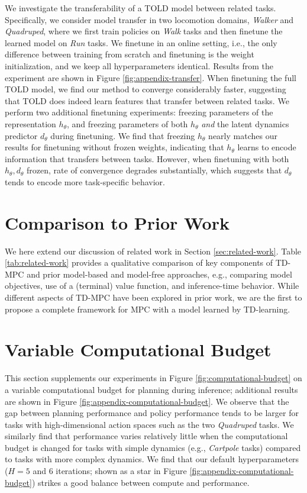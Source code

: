 \documentclass{article}
\begin{document}
We investigate the transferability of a TOLD model between related tasks. Specifically, we consider model transfer in two locomotion domains, \textit{Walker} and \textit{Quadruped}, where we first train policies on \textit{Walk} tasks and then finetune the learned model on \textit{Run} tasks. We finetune in an online setting, i.e., the only difference between training from scratch and finetuning is the weight initialization, and we keep all hyperparameters identical. Results from the experiment are shown in Figure \ref{fig:appendix-transfer}. When finetuning the full TOLD model, we find our method to converge considerably faster, suggesting that TOLD does indeed learn features that transfer between related tasks. We perform two additional finetuning experiments: freezing parameters of the representation $h_{\theta}$, and freezing parameters of both $h_{\theta}$ \textit{and} the latent dynamics predictor $d_{\theta}$ during finetuning. We find that freezing $h_{\theta}$ nearly matches our results for finetuning without frozen weights, indicating that $h_{\theta}$ learns to encode information that transfers between tasks. However, when finetuning with both $h_{\theta},d_{\theta}$ frozen, rate of convergence degrades substantially, which suggests that $d_{\theta}$ tends to encode more task-specific behavior.


\section{Comparison to Prior Work}
\label{sec:comparison-related-work}
We here extend our discussion of related work in Section \ref{sec:related-work}. Table \ref{tab:related-work} provides a qualitative comparison of key components of TD-MPC and prior model-based and model-free approaches, e.g., comparing model objectives, use of a (terminal) value function, and inference-time behavior. While different aspects of TD-MPC have been explored in prior work, we are the first to propose a complete framework for MPC with a model learned by TD-learning.

\section{Variable Computational Budget}
\label{sec:appendix-variable-compute}

This section supplements our experiments in Figure \ref{fig:computational-budget} on a variable computational budget for planning during inference; additional results are shown in Figure \ref{fig:appendix-computational-budget}. We observe that the gap between planning performance and policy performance tends to be larger for tasks with high-dimensional action spaces such as the two \textit{Quadruped} tasks. We similarly find that performance varies relatively little when the computational budget is changed for tasks with simple dynamics (e.g., \textit{Cartpole} tasks) compared to tasks with more complex dynamics. We find that our default hyperparameters ($H=5$ and 6 iterations; shown as a star in Figure \ref{fig:appendix-computational-budget}) strikes a good balance between compute and performance.
\end{document}
